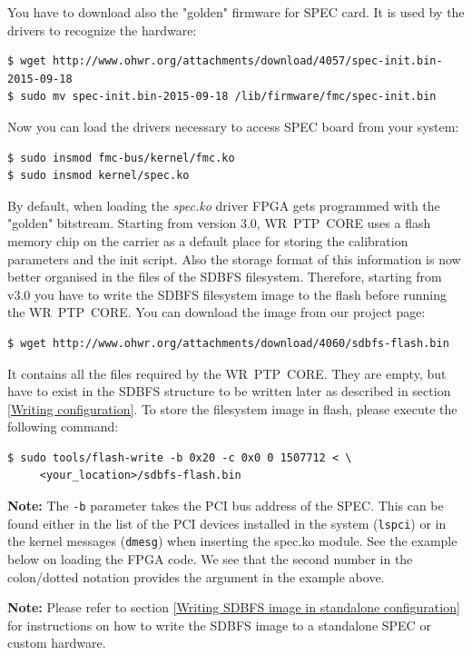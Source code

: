 \documentclass[a4paper, 12pt]{article}
\newcommand{\code}[1]{\texttt{#1}}
\newcommand{\codeHook}[1]{\mbox{\ttfamily\MakeTextUppercase{#1}}}
\begin{document}
You have to download also the "golden" firmware for \codeHook{spec} card. It is used by
the drivers to recognize the hardware:

\begin{lstlisting}
$ wget http://www.ohwr.org/attachments/download/4057/spec-init.bin-2015-09-18
$ sudo mv spec-init.bin-2015-09-18 /lib/firmware/fmc/spec-init.bin
\end{lstlisting}

Now you can load the drivers necessary to access \codeHook{spec} board from your
system:
\begin{lstlisting}
$ sudo insmod fmc-bus/kernel/fmc.ko
$ sudo insmod kernel/spec.ko
\end{lstlisting}

By default, when loading the \textit{spec.ko} driver FPGA gets programmed with
the "golden" bitstream. Starting from version 3.0, \codeHook{wr ptp core} uses a flash
memory chip on the carrier as a default place for storing the calibration
parameters and the init script. Also the storage format of this information is
now better organised in the files of the \codeHook{sdbfs} filesystem. Therefore,
starting from v3.0 you have to write the \codeHook{sdbfs} filesystem image to the
flash before running the \codeHook{wr ptp core}. You can download the image from our
project page:
\begin{lstlisting}
$ wget http://www.ohwr.org/attachments/download/4060/sdbfs-flash.bin
\end{lstlisting}
It contains all the files required by the \codeHook{wr ptp core}. They are empty, but
have to exist in the \codeHook{sdbfs} structure to be written later as described
in section \ref{Writing configuration}. To store the filesystem image in flash,
please execute the following command:
\begin{lstlisting}
$ sudo tools/flash-write -b 0x20 -c 0x0 0 1507712 < \
     <your_location>/sdbfs-flash.bin
\end{lstlisting}

\noindent\textbf{Note:} The \code{-b} parameter takes the PCI bus address of the SPEC. This
can be found either in the list of the PCI devices installed in the system
(\code{lspci}) or in the kernel messages (\code{dmesg}) when inserting the
spec.ko module. See the example below on loading the FPGA code. We see that the
second number in the colon/dotted notation provides the argument in the example
above.

\noindent\textbf{Note:} Please refer to section \ref{Writing SDBFS image in
standalone configuration} for instructions on how to write the \codeHook{sdbfs}
image to a standalone \codeHook{spec} or custom hardware.
\end{document}
